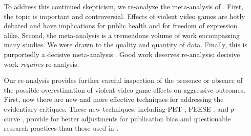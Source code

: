 \documentclass[man]{apa6}
\begin{document}
To address this continued skepticism, we re-analyze the meta-analysis of \citet{Anderson:etal:2010}. 
First, the topic is important and controversial. Effects of violent video games are hotly debated and have implications for public health and for freedom of expression alike. Second, the \citet{Anderson:etal:2010} meta-analysis is a tremendous volume of work encompassing many studies. We were drawn to the quality and quantity of data. Finally, this is purportedly a decisive meta-analysis \citep[see][]{Huesmann:2010}. Good work deserves re-analysis; decisive work {\em requires} re-analysis.

Our re-analysis provides further careful inspection of the presence or absence of the possible overestimation of violent video game effects on aggressive outcomes. First, now there are new and more effective techniques for addressing the evidentiary critiques.  These new techniques, including PET \citep[Precision-Effect Test,][]{Stanley:Doucouliagos:2014}, PEESE \citep[Precision-Effect Estimate with Standard Error,][]{Stanley:Doucouliagos:2014}, and $p$-curve \citep{Simonsohn:etal:2014,Simonsohn:etal:2014b}, provide for better adjustments for publication bias and questionable research practices than those used in \citet{Anderson:etal:2010}. 

\end{document}
